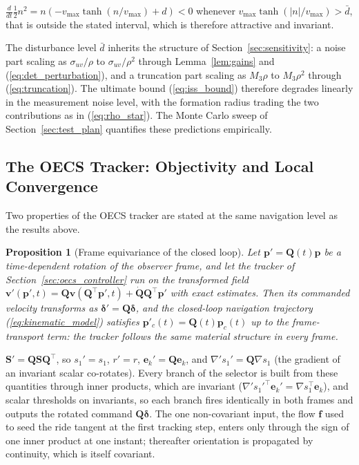 \documentclass[lettersize,journal]{IEEEtran}
\newtheorem{proposition}{Proposition}
\begin{document}
\begin{IEEEproof}
$\tfrac{d}{dt}\tfrac{1}{2}n^2 = n(-v_{\max}
\tanh(n/v_{\max}) + d) < 0$ whenever $v_{\max}\tanh(|n|/v_{\max}) >
\bar{d}$, that is outside the stated interval, which is therefore
attractive and invariant.
\end{IEEEproof}

The disturbance level $\bar{d}$ inherits the structure
of Section~\ref{sec:sensitivity}: a noise part scaling as
$\sigma_{uv}/\rho$ to $\sigma_{uv}/\rho^2$ through Lemma~\ref{lem:gains}
and (\ref{eq:det_perturbation}), and a truncation part scaling as
$M_3\rho$ to $M_3\rho^2$ through (\ref{eq:truncation}). The ultimate
bound (\ref{eq:iss_bound}) therefore
degrades linearly in the measurement noise level, with the formation
radius trading the two contributions as in (\ref{eq:rho_star}). The
Monte Carlo sweep of Section~\ref{sec:test_plan} quantifies these
predictions empirically.

\subsection{The OECS Tracker: Objectivity and Local Convergence}
\label{sec:stab_oecs}

Two properties of the OECS tracker are stated at the same navigation
level as the results above.

\begin{proposition}[Frame equivariance of the closed loop]
\label{prop:equivariance}
Let $\mathbf{p}'= \mathbf{Q}(t)\mathbf{p}$ be a time-dependent rotation
of the observer frame, and let the tracker of
Section~\ref{sec:oecs_controller} run on the transformed field
$\mathbf{v}'(\mathbf{p}', t) = \mathbf{Q}\mathbf{v}(\mathbf{Q}^\top
\mathbf{p}', t) + \dot{\mathbf{Q}}\mathbf{Q}^\top\mathbf{p}'$ with
exact estimates. Then its commanded velocity transforms as
$\boldsymbol{\delta}' = \mathbf{Q}\boldsymbol{\delta}$, and the
closed-loop navigation trajectory (\ref{eq:kinematic_model}) satisfies
$\mathbf{p}'_c(t) = \mathbf{Q}(t)\mathbf{p}_c(t)$ up to the
frame-transport term: the tracker follows the same material structure
in every frame.
\end{proposition}

\begin{IEEEproof}
$\mathbf{S}' = \mathbf{Q}\mathbf{S}\mathbf{Q}^\top$, so $s_1' = s_1$,
$r' = r$, $\mathbf{e}_k' = \mathbf{Q}\mathbf{e}_k$, and $\nabla' s_1' =
\mathbf{Q}\nabla s_1$ (the gradient of an invariant scalar co-rotates).
Every branch of the selector is built from these quantities through
inner products, which are invariant
($\nabla' s_1'^\top \mathbf{e}_k' = \nabla s_1^\top \mathbf{e}_k$), and
scalar thresholds on invariants, so each branch fires identically in
both frames and outputs the rotated command
$\mathbf{Q}\boldsymbol{\delta}$. The one non-covariant input, the flow
$\mathbf{f}$ used to seed the ride tangent at the first tracking step,
enters only through the sign of one inner product at one instant;
thereafter orientation is propagated by continuity, which is itself
covariant.
\end{IEEEproof}
\end{document}
